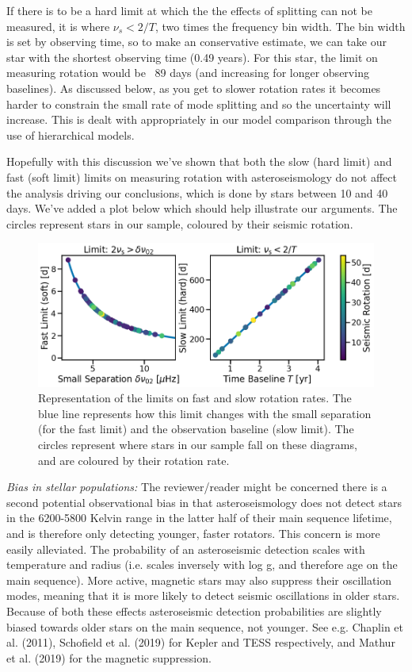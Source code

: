 \documentclass[11pt]{article}
\begin{document}
\begin{enumerate}
 If there is to be a hard limit at which the the effects of splitting can not be measured, it is where $\nu_s < 2/T$, two times the frequency bin width. The bin width is set by observing time, so to make an conservative estimate, we can take our star with the shortest observing time  (0.49 years). For this star, the limit on measuring rotation would be ~89 days (and increasing for longer observing baselines). As discussed below, as you get to slower rotation rates it becomes harder to constrain the small rate of mode splitting and so the uncertainty will increase. This is dealt with appropriately in our model comparison through the use of hierarchical models.
\end{enumerate}

Hopefully with this discussion we’ve shown that both the slow (hard limit) and fast (soft limit) limits on measuring rotation with asteroseismology do not affect the analysis driving our conclusions, which is done by stars between 10 and 40 days. We’ve added a plot below which should help illustrate our arguments. The circles represent stars in our sample, coloured by their seismic rotation.\\

\begin{figure}[h!]
\includegraphics[width=\textwidth]{image1.png}
\caption{Representation of the limits on fast and slow rotation rates. The blue line represents how this limit changes with the small separation (for the fast limit) and the observation baseline (slow limit). The circles represent where stars in our sample fall on these diagrams, and are coloured by their rotation rate.}
\end{figure}

\textit{Bias in stellar populations:} The reviewer/reader might be concerned there is a second potential observational bias in that asteroseismology does not detect stars in the 6200-5800 Kelvin range in the latter half of their main sequence lifetime, and is therefore only detecting younger, faster rotators. This concern is more easily alleviated. The probability of an asteroseismic detection scales with temperature and radius (i.e. scales inversely with log g, and therefore age on the main sequence). More active, magnetic stars may also suppress their oscillation modes, meaning that it is more likely to detect seismic oscillations in older stars.  Because of both these effects asteroseismic detection probabilities are slightly biased towards older stars on the main sequence, not younger. See e.g. Chaplin et al. (2011), Schofield et al. (2019) for Kepler and TESS respectively, and Mathur et al. (2019) for the magnetic suppression.
\end{document}
